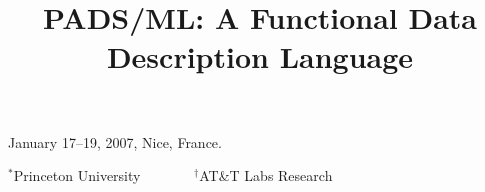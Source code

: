\documentclass{sigplanconf}
\begin{document}
 {January 17--19, 2007, Nice, France.}



\title{PADS/ML: A Functional Data Description Language}
{$^\ast$Princeton University \ \ \ \ \ \ \ $^\dagger$AT\&T Labs Research}
 { \ \ \ \ }

\newcommand{\cut}[1]{}
\newcommand{\reminder}[1]{{\it #1 }}
\newcommand{\poplversion}[1]{#1}
\newcommand{\trversion}[1]{}
\newcommand{\edcom}[1]{\textbf{*** #1}}

\newcommand{\qqquad}{\quad \qquad}

\newcommand{\appref}[1]{Appendix~\ref{#1}}
\newcommand{\secref}[1]{Section~\ref{#1}}
\newcommand{\tblref}[1]{Table~\ref{#1}}
\newcommand{\figref}[1]{Figure~\ref{#1}}
\newcommand{\listingref}[1]{Listing~\ref{#1}}

\newcommand{\eg}{{\em e.g.}}
\newcommand{\cf}{{\em cf.}}
\newcommand{\ie}{{\em i.e.}}
\newcommand{\etc}{{\em etc.\/}}
\newcommand{\naive}{na\"{\i}ve}
\newcommand{\role}{r\^{o}le}
\newcommand{\forte}{{fort\'{e}\/}}
\newcommand{\appr}{\~{}}

\newcommand{\kw}[1]{\bftt{#1}}
\newcommand{\pads}{\textsc{pads}}
\newcommand{\padsc}{\textsc{pads/c}}
\newcommand{\ipads}{\textsc{ipads}}
\newcommand{\padsl}{\textsc{padsl}}
\newcommand{\blt}{\textsc{blt}}
\newcommand{\ddc}{\textsc{ddc}$^{\alpha}$}
\newcommand{\ddcold}{\textsc{ddc}}
\newcommand{\padsml}{\textsc{pads/ml}}
\newcommand{\padsmlbig}{\textsc{PADS/ML}}
\newcommand{\ddl}{\textsc{ddl}}
\newcommand{\C}{\textsc{c}}
\newcommand{\perl}{\textsc{perl}}
\newcommand{\ml}{\textsc{ml}}
\newcommand{\smlnj}{\textsc{sml/nj}}
\newcommand{\ocaml}{\textsc{o'caml}}
\newcommand{\ocamlbig}{\textsc{O'CAML}}
\newcommand{\java}{\textsc{java}}
\newcommand{\xml}{\textsc{xml}}
\newcommand{\xquery}{\textsc{xquery}}
\newcommand{\datascript}{\textsc{datascript}}
\newcommand{\packettypes}{\textsc{packettypes}}
\newcommand{\lex}{\textsc{Lex}}
\newcommand{\yacc}{\textsc{YACC}}
\newcommand{\erlang}{\textsc{Erlang}}

\newcommand{\dibbler}{Sirius}
\newcommand{\ningaui}{Altair}
\newcommand{\darkstar}{Regulus}
\end{document}
